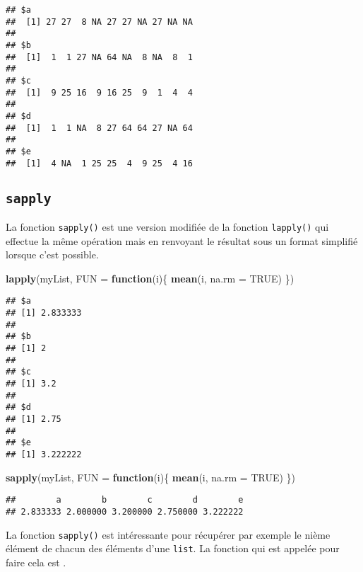 \documentclass[]{book}
\newenvironment{Shaded}{\begin{snugshade}}{\end{snugshade}}
\newcommand{\KeywordTok}[1]{\textcolor[rgb]{0.13,0.29,0.53}{\textbf{#1}}}
\newcommand{\DataTypeTok}[1]{\textcolor[rgb]{0.13,0.29,0.53}{#1}}
\newcommand{\OtherTok}[1]{\textcolor[rgb]{0.56,0.35,0.01}{#1}}
\newcommand{\ControlFlowTok}[1]{\textcolor[rgb]{0.13,0.29,0.53}{\textbf{#1}}}
\newcommand{\NormalTok}[1]{#1}
\theoremstyle{definition}
\theoremstyle{definition}
\theoremstyle{definition}
\theoremstyle{remark}
\begin{document}
\begin{verbatim}
## $a
##  [1] 27 27  8 NA 27 27 NA 27 NA NA
## 
## $b
##  [1]  1  1 27 NA 64 NA  8 NA  8  1
## 
## $c
##  [1]  9 25 16  9 16 25  9  1  4  4
## 
## $d
##  [1]  1  1 NA  8 27 64 64 27 NA 64
## 
## $e
##  [1]  4 NA  1 25 25  4  9 25  4 16
\end{verbatim}

\subsection{\texorpdfstring{\texttt{sapply}}{sapply}}\label{l17lapply}

La fonction \texttt{sapply()} est une version modifiée de la fonction
\texttt{lapply()} qui effectue la même opération mais en renvoyant le
résultat sous un format simplifié lorsque c'est possible.

\begin{Shaded}
\begin{Highlighting}[]
\KeywordTok{lapply}\NormalTok{(myList, }\DataTypeTok{FUN =} \ControlFlowTok{function}\NormalTok{(i)\{}
  \KeywordTok{mean}\NormalTok{(i, }\DataTypeTok{na.rm =} \OtherTok{TRUE}\NormalTok{)}
\NormalTok{\})}
\end{Highlighting}
\end{Shaded}

\begin{verbatim}
## $a
## [1] 2.833333
## 
## $b
## [1] 2
## 
## $c
## [1] 3.2
## 
## $d
## [1] 2.75
## 
## $e
## [1] 3.222222
\end{verbatim}

\begin{Shaded}
\begin{Highlighting}[]
\KeywordTok{sapply}\NormalTok{(myList, }\DataTypeTok{FUN =} \ControlFlowTok{function}\NormalTok{(i)\{}
  \KeywordTok{mean}\NormalTok{(i, }\DataTypeTok{na.rm =} \OtherTok{TRUE}\NormalTok{)}
\NormalTok{\})}
\end{Highlighting}
\end{Shaded}

\begin{verbatim}
##        a        b        c        d        e 
## 2.833333 2.000000 3.200000 2.750000 3.222222
\end{verbatim}

La fonction \texttt{sapply()} est intéressante pour récupérer par
exemple le nième élément de chacun des éléments d'une \texttt{list}. La
fonction qui est appelée pour faire cela est
\texttt{\textquotesingle{}{[}{[}\textquotesingle{}}.
\end{document}
